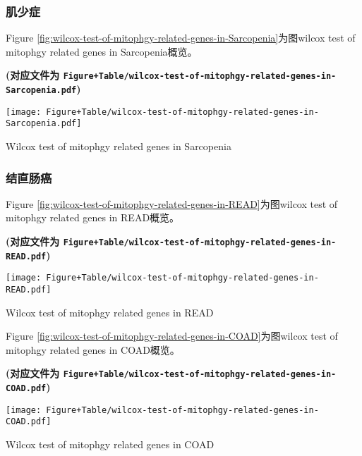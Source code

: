 \documentclass[
]{article}
\begin{document}
\hypertarget{ux808cux5c11ux75c7}{%
\subsubsection{肌少症}\label{ux808cux5c11ux75c7}}

Figure \ref{fig:wilcox-test-of-mitophgy-related-genes-in-Sarcopenia}为图wilcox test of mitophgy related genes in Sarcopenia概览。

\textbf{(对应文件为 \texttt{Figure+Table/wilcox-test-of-mitophgy-related-genes-in-Sarcopenia.pdf})}

\def\@captype{figure}
\begin{center}
\texttt{[image: Figure+Table/wilcox-test-of-mitophgy-related-genes-in-Sarcopenia.pdf]}
\caption{Wilcox test of mitophgy related genes in Sarcopenia}\label{fig:wilcox-test-of-mitophgy-related-genes-in-Sarcopenia}
\end{center}

\hypertarget{ux7ed3ux76f4ux80a0ux764c}{%
\subsubsection{结直肠癌}\label{ux7ed3ux76f4ux80a0ux764c}}

Figure \ref{fig:wilcox-test-of-mitophgy-related-genes-in-READ}为图wilcox test of mitophgy related genes in READ概览。

\textbf{(对应文件为 \texttt{Figure+Table/wilcox-test-of-mitophgy-related-genes-in-READ.pdf})}

\def\@captype{figure}
\begin{center}
\texttt{[image: Figure+Table/wilcox-test-of-mitophgy-related-genes-in-READ.pdf]}
\caption{Wilcox test of mitophgy related genes in READ}\label{fig:wilcox-test-of-mitophgy-related-genes-in-READ}
\end{center}

Figure \ref{fig:wilcox-test-of-mitophgy-related-genes-in-COAD}为图wilcox test of mitophgy related genes in COAD概览。

\textbf{(对应文件为 \texttt{Figure+Table/wilcox-test-of-mitophgy-related-genes-in-COAD.pdf})}

\def\@captype{figure}
\begin{center}
\texttt{[image: Figure+Table/wilcox-test-of-mitophgy-related-genes-in-COAD.pdf]}
\caption{Wilcox test of mitophgy related genes in COAD}\label{fig:wilcox-test-of-mitophgy-related-genes-in-COAD}
\end{center}
\end{document}

